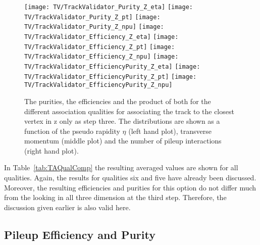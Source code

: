 \begin{figure}[!t]
  \centering
  \texttt{[image: TV/TrackValidator\_Purity\_Z\_eta]}
  \texttt{[image: TV/TrackValidator\_Purity\_Z\_pt]}
  \texttt{[image: TV/TrackValidator\_Purity\_Z\_npu]}
  \newline
  \texttt{[image: TV/TrackValidator\_Efficiency\_Z\_eta]}
  \texttt{[image: TV/TrackValidator\_Efficiency\_Z\_pt]}
  \texttt{[image: TV/TrackValidator\_Efficiency\_Z\_npu]}
  \newline
  \texttt{[image: TV/TrackValidator\_EfficiencyPurity\_Z\_eta]}
  \texttt{[image: TV/TrackValidator\_EfficiencyPurity\_Z\_pt]}
  \texttt{[image: TV/TrackValidator\_EfficiencyPurity\_Z\_npu]}
  \caption[Purities, efficiencies and their product for the different quality of the association map with associating to the closest vertex in z only as third step]{The purities, the efficiencies and the product of both for the different association qualities for associating the track to the closest vertex in z only as step three. The distributions are shown as a function of the pseudo rapidity $\eta$ (left hand plot), transverse momentum (middle plot) and the number of pileup interactions (right hand plot). \label{plot:TASEFRDQZSignal}}
\end{figure}

\clearpage{}

In Table~\ref{tab:TAQualComp} the resulting averaged values are shown for all qualities. Again, the results for qualities six and five have already been discussed. Moreover, the resulting efficiencies and purities for this option do not differ much from the looking in all three dimension at the third step. Therefore, the discussion given earlier is also valid here. 



\subsection{Pileup Efficiency and Purity \label{sec:TAPUEFR}}

